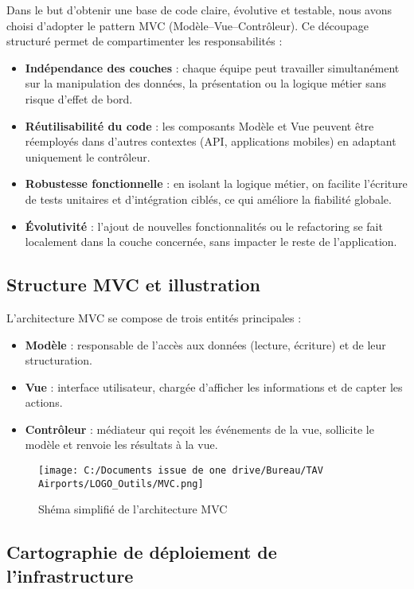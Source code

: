 \documentclass[a4paper,11pt]{report}
\begin{document}
Dans le but d’obtenir une base de code claire, évolutive et testable, nous avons choisi d’adopter le pattern MVC (Modèle–Vue–Contrôleur). Ce découpage structuré permet de compartimenter les responsabilités :  
\begin{itemize}
  \item \textbf{Indépendance des couches} : chaque équipe peut travailler simultanément sur la manipulation des données, la présentation ou la logique métier sans risque d’effet de bord.  
  \item \textbf{Réutilisabilité du code} : les composants Modèle et Vue peuvent être réemployés dans d’autres contextes (API, applications mobiles) en adaptant uniquement le contrôleur.  
  \item \textbf{Robustesse fonctionnelle} : en isolant la logique métier, on facilite l’écriture de tests unitaires et d’intégration ciblés, ce qui améliore la fiabilité globale.   
  \item \textbf{Évolutivité} : l’ajout de nouvelles fonctionnalités ou le refactoring se fait localement dans la couche concernée, sans impacter le reste de l’application.  
\end{itemize}

\newpage
\subsection{Structure MVC et illustration}
\label{ssec:structure-mvc}

L’architecture MVC se compose de trois entités principales :

\begin{itemize}
  \item \textbf{Modèle} : responsable de l’accès aux données (lecture, écriture) et de leur structuration.
  \item \textbf{Vue} : interface utilisateur, chargée d’afficher les informations et de capter les actions.
  \item \textbf{Contrôleur} : médiateur qui reçoit les événements de la vue, sollicite le modèle et renvoie les résultats à la vue.
\end{itemize}
\begin{figure}[H]
\centering
\texttt{[image: C:/Documents issue de one drive/Bureau/TAV Airports/LOGO\_Outils/MVC.png]}
\caption{Shéma simplifié de l'architecture MVC}
\end{figure}

\subsection{Cartographie de déploiement de l’infrastructure}
\label{ssec:cartographie-deploiement}
\end{document}
